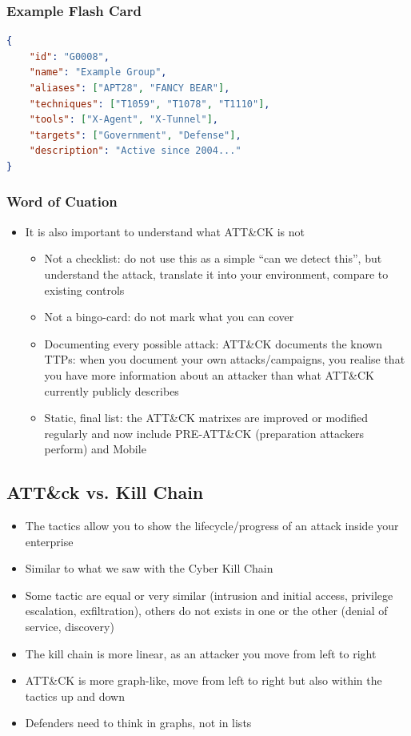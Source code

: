 \subsubsection{Example Flash Card}
\begin{lstlisting}[language=JSON]
{
    "id": "G0008",
    "name": "Example Group",
    "aliases": ["APT28", "FANCY BEAR"],
    "techniques": ["T1059", "T1078", "T1110"],
    "tools": ["X-Agent", "X-Tunnel"],
    "targets": ["Government", "Defense"],
    "description": "Active since 2004..."
}
\end{lstlisting}

\subsubsection{Word of Cuation}
\begin{itemize}
  \item It is also important to understand what ATT\&CK is not
  \begin{itemize}
    \item Not a checklist: do not use this as a simple “can we detect this”, but understand the attack, translate it into your environment, compare to existing controls
    \item Not a bingo-card: do not mark what you can cover
    \item Documenting every possible attack: ATT\&CK documents the known TTPs: when you document your own attacks/campaigns, you realise that you have more information about an attacker than what ATT\&CK currently publicly describes
    \item Static, final list: the ATT\&CK matrixes are improved or modified regularly and now include PRE-ATT\&CK (preparation attackers perform) and Mobile
  \end{itemize}
\end{itemize}

\subsection{ATT\&ck vs. Kill Chain}
\begin{itemize}
  \item The tactics allow you to show the lifecycle/progress of an attack inside your enterprise
  \item Similar to what we saw with the Cyber Kill Chain
    \item Some tactic are equal or very similar (intrusion and initial access, privilege escalation, exfiltration), others do not exists in one or the other (denial of service, discovery)
  \item The kill chain is more linear, as an attacker you move from left to right
  \item ATT\&CK is more graph-like, move from left to right but also within the tactics up and down
  \item Defenders need to think in graphs, not in lists
\end{itemize}


